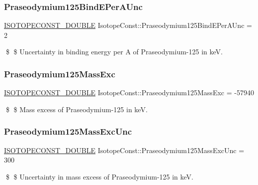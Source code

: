 \subsubsection{\texorpdfstring{Praseodymium125\+Bind\+E\+Per\+A\+Unc}{Praseodymium125BindEPerAUnc}}
{\footnotesize\ttfamily \mbox{\hyperlink{group___isotope_const-_macros_ga8f45a7272ce02c0b4c65c44636ed719a}{I\+S\+O\+T\+O\+P\+E\+C\+O\+N\+S\+T\+\_\+\+D\+O\+U\+B\+LE}} Isotope\+Const\+::\+Praseodymium125\+Bind\+E\+Per\+A\+Unc = 2}

\$ \$ Uncertainty in binding energy per A of Praseodymium-\/125 in keV. \mbox{\label{group___isotope_const-_praseodymium-_pr125_gabd04886209daf2067dccda7708b0ff0b}} 
\subsubsection{\texorpdfstring{Praseodymium125\+Mass\+Exc}{Praseodymium125MassExc}}
{\footnotesize\ttfamily \mbox{\hyperlink{group___isotope_const-_macros_ga8f45a7272ce02c0b4c65c44636ed719a}{I\+S\+O\+T\+O\+P\+E\+C\+O\+N\+S\+T\+\_\+\+D\+O\+U\+B\+LE}} Isotope\+Const\+::\+Praseodymium125\+Mass\+Exc = -\/57940}

\$ \$ Mass excess of Praseodymium-\/125 in keV. \mbox{\label{group___isotope_const-_praseodymium-_pr125_ga40f1b04b73bc95389f3ca80829871aa0}} 
\subsubsection{\texorpdfstring{Praseodymium125\+Mass\+Exc\+Unc}{Praseodymium125MassExcUnc}}
{\footnotesize\ttfamily \mbox{\hyperlink{group___isotope_const-_macros_ga8f45a7272ce02c0b4c65c44636ed719a}{I\+S\+O\+T\+O\+P\+E\+C\+O\+N\+S\+T\+\_\+\+D\+O\+U\+B\+LE}} Isotope\+Const\+::\+Praseodymium125\+Mass\+Exc\+Unc = 300}

\$ \$ Uncertainty in mass excess of Praseodymium-\/125 in keV. \mbox{\label{group___isotope_const-_praseodymium-_pr125_gaf7c0bb10c6a39af294512f03e3368067}} 
